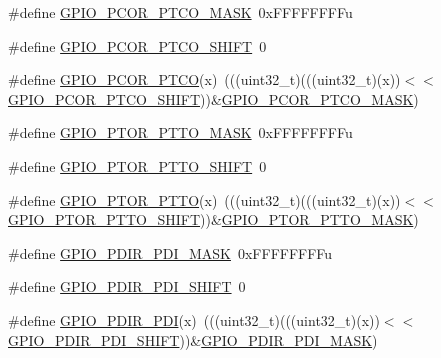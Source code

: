 \begin{DoxyCompactItemize}
\#define \hyperlink{group___g_p_i_o___register___masks_ga0b8378768ee61ea2c685a1687c90fa03}{G\+P\+I\+O\+\_\+\+P\+C\+O\+R\+\_\+\+P\+T\+C\+O\+\_\+\+M\+A\+SK}~0x\+F\+F\+F\+F\+F\+F\+F\+Fu
\item 
\#define \hyperlink{group___g_p_i_o___register___masks_ga5c9203b830cbd86cd8d0189872b5c772}{G\+P\+I\+O\+\_\+\+P\+C\+O\+R\+\_\+\+P\+T\+C\+O\+\_\+\+S\+H\+I\+FT}~0
\item 
\#define \hyperlink{group___g_p_i_o___register___masks_ga3a9c3710923cd50fc2df4e678180eb1d}{G\+P\+I\+O\+\_\+\+P\+C\+O\+R\+\_\+\+P\+T\+CO}(x)~(((uint32\+\_\+t)(((uint32\+\_\+t)(x))$<$$<$\hyperlink{group___g_p_i_o___register___masks_ga5c9203b830cbd86cd8d0189872b5c772}{G\+P\+I\+O\+\_\+\+P\+C\+O\+R\+\_\+\+P\+T\+C\+O\+\_\+\+S\+H\+I\+FT}))\&\hyperlink{group___g_p_i_o___register___masks_ga0b8378768ee61ea2c685a1687c90fa03}{G\+P\+I\+O\+\_\+\+P\+C\+O\+R\+\_\+\+P\+T\+C\+O\+\_\+\+M\+A\+SK})
\item 
\#define \hyperlink{group___g_p_i_o___register___masks_gaa75953b5d9d23bdaa6c24232e1a52680}{G\+P\+I\+O\+\_\+\+P\+T\+O\+R\+\_\+\+P\+T\+T\+O\+\_\+\+M\+A\+SK}~0x\+F\+F\+F\+F\+F\+F\+F\+Fu
\item 
\#define \hyperlink{group___g_p_i_o___register___masks_ga70e5442b3a119665aafb9e6e5b48bbd5}{G\+P\+I\+O\+\_\+\+P\+T\+O\+R\+\_\+\+P\+T\+T\+O\+\_\+\+S\+H\+I\+FT}~0
\item 
\#define \hyperlink{group___g_p_i_o___register___masks_ga40757476c8889ca9d4cb7017b6c5ab60}{G\+P\+I\+O\+\_\+\+P\+T\+O\+R\+\_\+\+P\+T\+TO}(x)~(((uint32\+\_\+t)(((uint32\+\_\+t)(x))$<$$<$\hyperlink{group___g_p_i_o___register___masks_ga70e5442b3a119665aafb9e6e5b48bbd5}{G\+P\+I\+O\+\_\+\+P\+T\+O\+R\+\_\+\+P\+T\+T\+O\+\_\+\+S\+H\+I\+FT}))\&\hyperlink{group___g_p_i_o___register___masks_gaa75953b5d9d23bdaa6c24232e1a52680}{G\+P\+I\+O\+\_\+\+P\+T\+O\+R\+\_\+\+P\+T\+T\+O\+\_\+\+M\+A\+SK})
\item 
\#define \hyperlink{group___g_p_i_o___register___masks_gacb7c8cc976937906c8e803811a7fbb68}{G\+P\+I\+O\+\_\+\+P\+D\+I\+R\+\_\+\+P\+D\+I\+\_\+\+M\+A\+SK}~0x\+F\+F\+F\+F\+F\+F\+F\+Fu
\item 
\#define \hyperlink{group___g_p_i_o___register___masks_ga99fd9212dd769bb1964a28a864c6c741}{G\+P\+I\+O\+\_\+\+P\+D\+I\+R\+\_\+\+P\+D\+I\+\_\+\+S\+H\+I\+FT}~0
\item 
\#define \hyperlink{group___g_p_i_o___register___masks_ga8f80c8e42743151c73569b5cef49f2b2}{G\+P\+I\+O\+\_\+\+P\+D\+I\+R\+\_\+\+P\+DI}(x)~(((uint32\+\_\+t)(((uint32\+\_\+t)(x))$<$$<$\hyperlink{group___g_p_i_o___register___masks_ga99fd9212dd769bb1964a28a864c6c741}{G\+P\+I\+O\+\_\+\+P\+D\+I\+R\+\_\+\+P\+D\+I\+\_\+\+S\+H\+I\+FT}))\&\hyperlink{group___g_p_i_o___register___masks_gacb7c8cc976937906c8e803811a7fbb68}{G\+P\+I\+O\+\_\+\+P\+D\+I\+R\+\_\+\+P\+D\+I\+\_\+\+M\+A\+SK})
$$
\end{DoxyCompactItemize}
